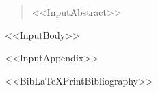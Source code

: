 \documentclass[<<DocumentClassOptions>>, draft]{article}
\begin{document}
\begin{abstract}
<<InputAbstract>>
\end{abstract}

<<InputBody>>

\appendix
<<InputAppendix>>

<<BibLaTeXPrintBibliography>>
\end{document}
